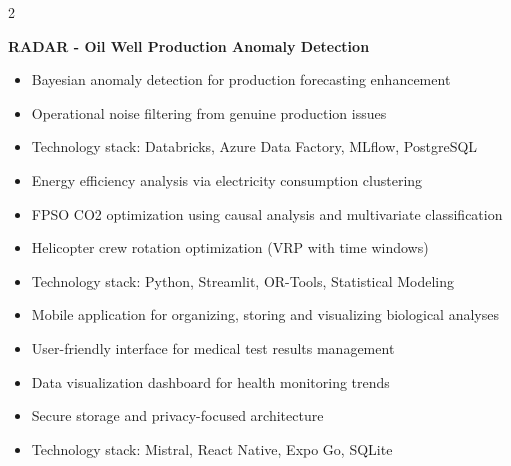 \documentclass[10pt,a4paper,withhyper]{altacv}
\begin{document}
\begin{paracol}{2}
\divider

\textbf{RADAR - Oil Well Production Anomaly Detection}
\begin{itemize}
\item Bayesian anomaly detection for production forecasting enhancement
\item Operational noise filtering from genuine production issues
\item Technology stack: Databricks, Azure Data Factory, MLflow, PostgreSQL
\end{itemize}

\divider

\begin{itemize}
\item Energy efficiency analysis via electricity consumption clustering
\item FPSO CO2 optimization using causal analysis and multivariate classification
\item Helicopter crew rotation optimization (VRP with time windows)
\item Technology stack: Python, Streamlit, OR-Tools, Statistical Modeling
\end{itemize}

\medskip


\begin{itemize}
\item Mobile application for organizing, storing and visualizing biological analyses
\item User-friendly interface for medical test results management
\item Data visualization dashboard for health monitoring trends
\item Secure storage and privacy-focused architecture
\item Technology stack: Mistral, React Native, Expo Go, SQLite
\end{itemize}


\medskip




\end{paracol}
\end{document}

